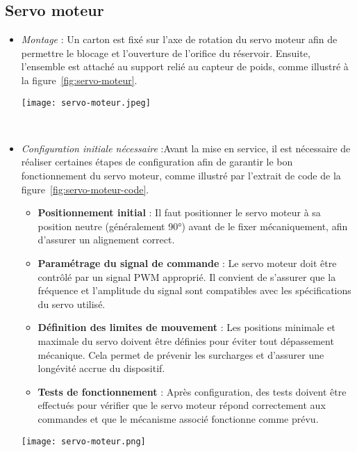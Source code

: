 \subsection{Servo moteur}
\begin{itemize}
	\item \textit{Montage} : Un carton est fixé sur l'axe de rotation du servo moteur afin de permettre le blocage et l'ouverture de l'orifice du réservoir. Ensuite, l'ensemble est attaché au support relié au capteur de poids, comme illustré à la figure~\ref{fig:servo-moteur}.\\
	
	\begin{minipage}{\linewidth}
  		\centering
  		\texttt{[image: servo-moteur.jpeg]}
  		\label{fig:servo-moteur}
	\end{minipage}
	\\
	\item \textit{Configuration initiale nécessaire} :Avant la mise en service, il est nécessaire de réaliser certaines étapes de configuration afin de garantir le bon fonctionnement du servo moteur, comme illustré par l'extrait de code de la figure~\ref{fig:servo-moteur-code}.
	\begin{itemize}
		\item \textbf{Positionnement initial} : Il faut positionner le servo moteur à sa position neutre (généralement 90°) avant de le fixer mécaniquement, afin d'assurer un alignement correct.
		\item \textbf{Paramétrage du signal de commande} : Le servo moteur doit être contrôlé par un signal PWM approprié. Il convient de s'assurer que la fréquence et l'amplitude du signal sont compatibles avec les spécifications du servo utilisé.
		\item \textbf{Définition des limites de mouvement} : Les positions minimale et maximale du servo doivent être définies pour éviter tout dépassement mécanique. Cela permet de prévenir les surcharges et d'assurer une longévité accrue du dispositif.
		\item \textbf{Tests de fonctionnement} : Après configuration, des tests doivent être effectués pour vérifier que le servo moteur répond correctement aux commandes et que le mécanisme associé fonctionne comme prévu.
	\end{itemize}
	
	\begin{minipage}{\linewidth}
  		\centering
  		\texttt{[image: servo-moteur.png]}
  		\label{fig:servo-moteur-code}
	\end{minipage}
\end{itemize}



